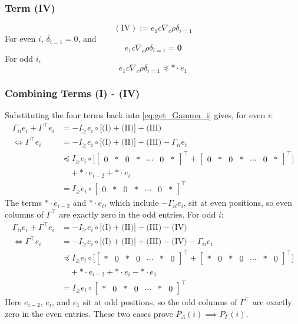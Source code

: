 \documentclass[a4paper,12pt]{article}
\theoremstyle{definition}
\begin{document}
\subsubsection{Term (IV)}
$$(\text{IV}) := e_1c\nabla_{c} \rho \delta_{i=1}$$
For even $i$, $\delta_{i=1} = 0$, and $$e_1c\nabla_{c} \rho \delta_{i=1} = \mathbf{0}$$
For odd $i$, 
$$e_1c\nabla_{c} \rho \delta_{i=1} \preceq * \cdot e_1$$
\subsubsection{Combining Terms (I) - (IV)}
Substituting the four terms back into \eqref{eq:get_Gamma_i} gives, for even $i$:
\begin{align*} 
\Gamma_{ii}e_i + \Gamma^\top e_i &= -I_{\geq}e_i \circ \Big[\text{(I)} + \text{(II)}\Big] + \text{(III)}
\\
\iff \Gamma^\top e_i &= -I_{\geq}e_i \circ \Big[\text{(I)} + \text{(II)}\Big] + \text{(III)} - \Gamma_{ii}e_i 
\\
&\preceq I_{\geq}e_i \circ \Big[\begin{bmatrix} 0 \!& * \!& 0 \!& * \!& \cdots \!& 0 \!& *\end{bmatrix} ^\top + \begin{bmatrix} 0 \!& * \!& 0 \!& *  \!& \cdots \!& 0 \!& * \end{bmatrix} ^\top \Big]
    \\
    &\quad + * \cdot e_{i-2} + *\cdot e_{i}
    \\
    &= I_{\geq}e_i \circ \begin{bmatrix} 0 & * & 0 & * & \cdots & 0 & *\end{bmatrix} ^\top
\end{align*}
The terms $* \cdot e_{i-2}$ and $* \cdot e_i$, which include $-\Gamma_{ii} e_i$, sit at even positions, so even columns of $\Gamma^\top$ are exactly zero in the odd entries. For odd $i$:
\begin{align*} 
\Gamma_{ii}e_i + \Gamma^\top e_i &= -I_{\geq}e_i \circ \Big[\text{(I)} + \text{(II)}\Big] + \text{(III)} - \text{(IV)}
\\
\iff \Gamma^\top e_i &= -I_{\geq}e_i \circ \Big[\text{(I)} + \text{(II)}\Big] + \text{(III)} - \text{(IV)} - \Gamma_{ii}e_i 
\\
&\preceq I_{\geq}e_i \circ \Big[\begin{bmatrix} * \!& 0 \!& * \!& 0 \!& \cdots \!& * \!& 0\end{bmatrix} ^\top + \begin{bmatrix} * \!& 0 \!& * \!& 0 \!& \cdots \!& * \!& 0\end{bmatrix} ^\top \Big]
    \\
    &\quad + * \cdot e_{i-2} + *\cdot e_{i} - *\cdot e_{1}
    \\
    &= I_{\geq}e_i \circ \begin{bmatrix} * & 0 & * & 0 & \cdots & * & 0\end{bmatrix} ^\top
\end{align*}
Here $e_{i-2}$, $e_i$, and $e_1$ sit at odd positions, so the odd columns of $\Gamma^\top$ are exactly zero in the even entries. These two cases prove $P_\Lambda(i) \implies P_\Gamma(i)$.
\end{document}
